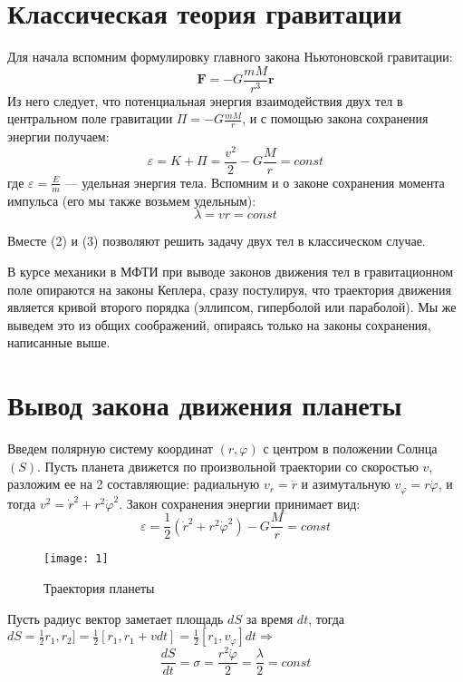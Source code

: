 \documentclass[12pt]{article}
\newcommand{\te}{\ensuremath{\Rightarrow}}
\begin{document}
\section{Классическая теория гравитации}
Для начала вспомним формулировку главного закона Ньютоновской гравитации: 
\begin{equation}
\mathbf{F} = -G \dfrac{mM}{r^3}\mathbf{r}
\end{equation}
Из него следует, что потенциальная энергия взаимодействия двух тел в центральном поле гравитации $ \Pi = - G\frac{mM}{r}$, и с помощью закона сохранения энергии получаем: 
\begin{equation}
\varepsilon = K + \Pi = \frac{v^2}{2} - G\frac{M}{r} = const
\end{equation}
где $ \varepsilon = \frac{E}{m} $ --- удельная энергия тела. Вспомним и о законе сохранения момента импульса (его мы также возьмем удельным): 
\begin{equation}
\lambda = vr = const
\end{equation}

Вместе (2) и (3) позволяют решить задачу двух тел в классическом случае. 

\vspace{0.1cm}
В курсе механики в МФТИ при выводе законов движения тел в гравитационном поле опираются на законы Кеплера, сразу постулируя, что траектория движения является кривой второго порядка (эллипсом, гиперболой или параболой). Мы же выведем это из общих соображений, опираясь только на законы сохранения, написанные выше.

\section{Вывод закона движения планеты}
Введем полярную систему координат $ (r,\varphi) $ с центром в положении Солнца $ (S) $. Пусть планета движется по произвольной траектории со скоростью $ v $, разложим ее на 2 составляющие: радиальную $ v_r = \dot{r} $ и азимутальную $ v_\varphi = r\dot{\varphi}  $, и тогда $ v^2 = \dot{r}^2 + r^2\dot{\varphi}^2 $. Закон сохранения энергии принимает вид:
\begin{equation}
\varepsilon = \frac{1}{2}(\dot{r}^2 + r^2\dot{\varphi}^2) - G\frac{M}{r} = const
\end{equation}
  \begin{wrapfigure}{l}{0.4\linewidth} 
  	\texttt{[image: 1]}
  	\caption{Траектория планеты}
  \end{wrapfigure}
Пусть радиус вектор заметает площадь $ dS $ за время $ dt $, тогда \\ $ dS = \frac{1}{2}{r_1}, r_2] =\frac{1}{2}[r_1, r_1 + vdt]  = \frac{1}{2}[r_1, v_\varphi]dt \te $ 
\begin{equation}
\dfrac{dS}{dt} = \sigma = \dfrac{r^2\dot{\varphi}}{2} = \dfrac{\lambda}{2}  =const
\end{equation}
\end{document}
